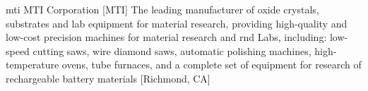 \newglsXcompany%
{mti}%
{MTI Corporation}%
[MTI]%
{The leading manufacturer of oxide crystals, substrates and lab equipment for material research, providing high{\--}quality and low{\--}cost precision machines for material research and \gls{rnd} Labs, including: low{\--}speed cutting saws, wire diamond saws, automatic polishing machines, high{\--}temperature ovens, tube furnaces, and a complete set of equipment for research of rechargeable battery materials \cite{website:MTI_Corporation}}%
[Richmond, CA]%